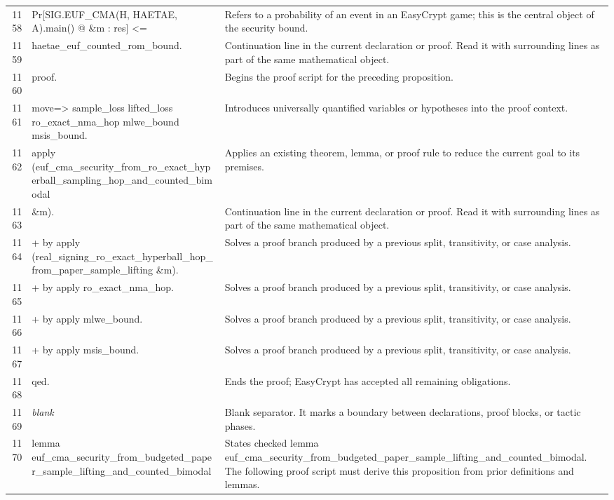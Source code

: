 \documentclass[10pt]{article}
\begin{document}
\begin{longtable}{r L{0.53\textwidth} L{0.37\textwidth}}
1158 & {\ttfamily\scriptsize   Pr[SIG.EUF\_CMA(H, HAETAE, A).main() @ \&m : res] <=} & Refers to a probability of an event in an EasyCrypt game; this is the central object of the security bound. \\
1159 & {\ttfamily\scriptsize     haetae\_euf\_counted\_rom\_bound.} & Continuation line in the current declaration or proof.  Read it with surrounding lines as part of the same mathematical object. \\
1160 & {\ttfamily\scriptsize proof.} & Begins the proof script for the preceding proposition. \\
1161 & {\ttfamily\scriptsize move=> sample\_loss lifted\_loss ro\_exact\_nma\_hop mlwe\_bound msis\_bound.} & Introduces universally quantified variables or hypotheses into the proof context. \\
1162 & {\ttfamily\scriptsize apply (euf\_cma\_security\_from\_ro\_exact\_hyperball\_sampling\_hop\_and\_counted\_bimodal} & Applies an existing theorem, lemma, or proof rule to reduce the current goal to its premises. \\
1163 & {\ttfamily\scriptsize          \&m).} & Continuation line in the current declaration or proof.  Read it with surrounding lines as part of the same mathematical object. \\
1164 & {\ttfamily\scriptsize + by apply (real\_signing\_ro\_exact\_hyperball\_hop\_from\_paper\_sample\_lifting \&m).} & Solves a proof branch produced by a previous split, transitivity, or case analysis. \\
1165 & {\ttfamily\scriptsize + by apply ro\_exact\_nma\_hop.} & Solves a proof branch produced by a previous split, transitivity, or case analysis. \\
1166 & {\ttfamily\scriptsize + by apply mlwe\_bound.} & Solves a proof branch produced by a previous split, transitivity, or case analysis. \\
1167 & {\ttfamily\scriptsize + by apply msis\_bound.} & Solves a proof branch produced by a previous split, transitivity, or case analysis. \\
1168 & {\ttfamily\scriptsize qed.} & Ends the proof; EasyCrypt has accepted all remaining obligations. \\
1169 & {\ttfamily\scriptsize \emph{blank}} & Blank separator.  It marks a boundary between declarations, proof blocks, or tactic phases. \\
1170 & {\ttfamily\scriptsize lemma euf\_cma\_security\_from\_budgeted\_paper\_sample\_lifting\_and\_counted\_bimodal} & States checked lemma euf\_cma\_security\_from\_budgeted\_paper\_sample\_lifting\_and\_counted\_bimodal.  The following proof script must derive this proposition from prior definitions and lemmas. \\

\end{longtable}
\end{document}
